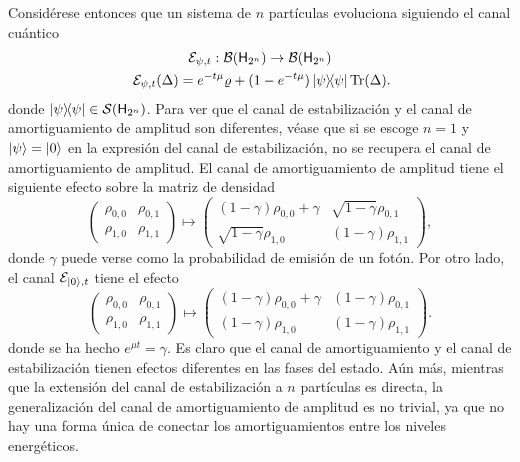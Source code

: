 Considérese entonces que un sistema de $n$ partículas evoluciona siguiendo el canal cuántico
\begin{gather}
    \mcE_{\psi,t}:\mcB(\hilbert_{2^{n}}) \rightarrow \mcB(\hilbert_{2^{n}})\nonumber\\
    \mcE_{\psi,t}(\Delta)=e^{-t\mu}\varrho+(1-e^{-t \mu})\dyad{\psi}\Tr(\Delta)\rlap{.}\nonumber
\end{gather}
donde $\dyad{\psi}\in \densityspace{2^{n}}$. Para ver que el canal de estabilización y el canal de amortiguamiento de amplitud son diferentes, véase que si se escoge $n=1$ y $\ket{\psi}=\ket{0}$ en la expresión del canal de estabilización, no se recupera el canal de amortiguamiento de amplitud. El canal de amortiguamiento de amplitud tiene el siguiente efecto sobre la matriz de densidad
\begin{equation}
    \begin{pmatrix}
        \rho_{0,0} & \rho_{0,1} \\
        \rho_{1,0} & \rho_{1,1}
    \end{pmatrix}\mapsto\begin{pmatrix}
        (1-\gamma)\rho_{0,0}+\gamma & \sqrt{1-\gamma}\rho_{0,1} \\
        \sqrt{1-\gamma}\rho_{1,0} & (1-\gamma)\rho_{1,1}
    \end{pmatrix},\nonumber
\end{equation}
donde $\gamma$ puede verse como la probabilidad de emisión de un fotón. Por otro lado, el canal $\mathcal{E}_{\ket{0},t}$ tiene el efecto
\begin{equation}
    \begin{pmatrix}
        \rho_{0,0} & \rho_{0,1} \\
        \rho_{1,0} & \rho_{1,1}
    \end{pmatrix}\mapsto\begin{pmatrix}
        (1-\gamma)\rho_{0,0}+\gamma & (1-\gamma)\rho_{0,1} \\
        (1-\gamma)\rho_{1,0} & (1-\gamma)\rho_{1,1}
    \end{pmatrix}.\nonumber
\end{equation}
donde se ha hecho $e^{\mu t}=\gamma$. Es claro que el canal de amortiguamiento y el canal de estabilización tienen efectos diferentes en las fases del estado. Aún más, mientras que la extensión del canal de estabilización a $n$ partículas es directa, la generalización del canal de amortiguamiento de amplitud es no trivial, ya que no hay una forma única de conectar los amortiguamientos entre los niveles energéticos.

